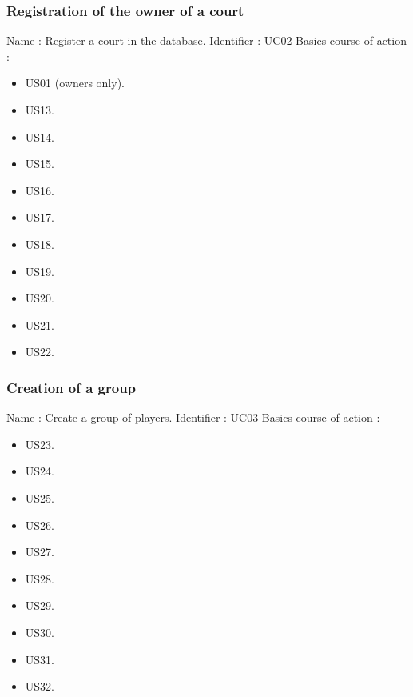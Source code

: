 \subsubsection{Registration of the owner of a court}

Name : Register a court in the database. \newline
Identifier : UC02 \newline
Basics course of action : \newline
\begin{itemize}
	\item US01 (owners only).
	\item US13.
	\item US14.
	\item US15.
	\item US16.
	\item US17.
	\item US18.
	\item US19.
	\item US20.
	\item US21.
	\item US22.
\end{itemize}


\subsubsection{Creation of a group}

Name : Create a group of players. \newline
Identifier : UC03 \newline
Basics course of action : \newline
\begin{itemize}
	\item US23.
	\item US24.
	\item US25.
	\item US26.
	\item US27.
	\item US28.
	\item US29.
	\item US30.
	\item US31.
	\item US32.
\end{itemize}
